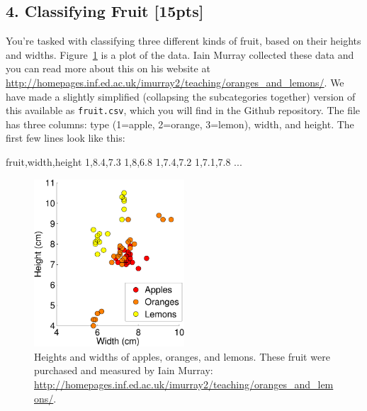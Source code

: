 \documentclass[submit]{harvardml}
\begin{document}
\subsection*{4. Classifying Fruit [15pts]}
You're tasked with  classifying three different kinds of fruit, based on their
heights and widths.  Figure~\ref{fig:fruit} is a plot of the data.  Iain Murray
collected these data and you can read more about this on his website at
\url{http://homepages.inf.ed.ac.uk/imurray2/teaching/oranges_and_lemons/}.  We
have made a slightly simplified (collapsing the subcategories together) version
of this available as \verb|fruit.csv|, which you will find in the Github repository.
The file has three columns: type (1=apple, 2=orange, 3=lemon), width,
and height.  The first few lines look like this:
\begin{csv}
fruit,width,height
1,8.4,7.3
1,8,6.8
1,7.4,7.2
1,7.1,7.8
...
\end{csv}
\begin{figure}[h]
\centering
\includegraphics[width=0.5\textwidth]{fruit}
\caption{Heights and widths of apples, oranges, and lemons.  These fruit were
purchased and measured by Iain Murray:
\url{http://homepages.inf.ed.ac.uk/imurray2/teaching/oranges_and_lemons/}.}
\label{fig:fruit}
\end{figure}
\end{document}
